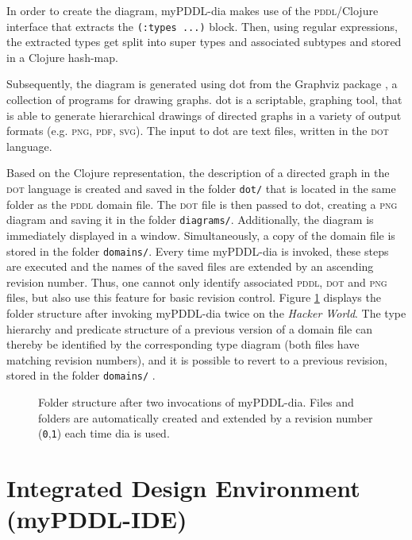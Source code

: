 \documentclass[a4paper,12pt]{report}
\newcommand{\mypddl}{\smallerft[0.8]{myPDDL}\xspace}
\newcommand{\pddl}{\textsc{pddl}\xspace}
\newcommand\smallerft[2][0.85]{{\scalefont{#1}#2}}
\begin{document}
In order to create the diagram, \mypddl-dia makes use of the
\pddl/Clojure interface that extracts the \texttt{(:types ...)} block. Then,
using regular expressions, the extracted types get split into super
types and associated subtypes and stored in a Clojure hash-map.

Subsequently, the diagram is generated using dot from the Graphviz
package \cite{ellson2002graphviz}, a collection of programs for
drawing graphs. dot is a scriptable, graphing tool, that is able to
generate hierarchical drawings of directed graphs in a variety of
output formats (e.g. \textsc{png}, \textsc{pdf}, \textsc{svg}). The
input to dot are text files, written in the \textsc{dot} language.

Based on the Clojure representation, the description of a directed
graph in the \textsc{dot} language is created and saved in the folder
\texttt{dot/} that is located in the same folder as the \pddl domain file.
The \textsc{dot} file is then passed to dot, creating a \textsc{png}
diagram and saving it in the folder \texttt{diagrams/}. Additionally, the
diagram is immediately displayed in a window. Simultaneously, a copy
of the domain file is stored in the folder \texttt{domains/}. Every time
\mypddl-dia is invoked, these steps are executed and the names of the
saved files are extended by an ascending revision number. Thus, one
cannot only identify associated \pddl, \textsc{dot} and \textsc{png}
files, but also use this feature for basic revision control. Figure
\ref{fig:mypddl-new-project-folder} displays the folder structure
after invoking \mypddl-dia twice on the \emph{Hacker World}. The type
hierarchy and predicate structure of a previous version of a domain
file can thereby be identified by the corresponding type diagram (both
files have matching revision numbers), and it is possible to revert to
a previous revision, stored in the folder \texttt{domains/} .

\begin{figure}[] 
\caption[\mypddl-dia folder structure]{\label{fig:mypddl-new-project-folder}
Folder structure after two invocations of \mypddl-dia.
Files and folders are automatically created and extended by a revision number
(\texttt{0},\texttt{1}) each time dia is used.}
\end{figure}

\section{Integrated Design Environment (myPDDL-IDE)}
\label{sec-4-7}
\end{document}
